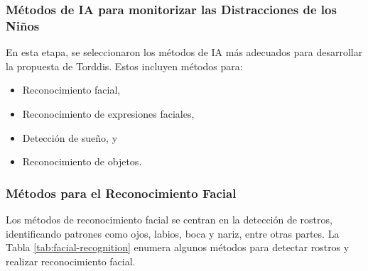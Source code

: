 \documentclass[a4paper,fleqn]{cas-sc}
\begin{document}
		\subsubsection*{Métodos de IA para monitorizar las Distracciones de los Niños}
		
		En esta etapa, se seleccionaron los métodos de IA más adecuados para desarrollar la propuesta de Torddis. Estos incluyen métodos para:
		
		\begin{itemize}
			\item Reconocimiento facial,
			\item Reconocimiento de expresiones faciales,
			\item Detección de sueño, y
			\item Reconocimiento de objetos.
		\end{itemize}
		
		\subsubsection*{Métodos para el Reconocimiento Facial}
		Los métodos de reconocimiento facial se centran en la detección de rostros, identificando patrones como ojos, labios, boca y nariz, entre otras partes. La Tabla \ref{tab:facial-recognition} enumera algunos métodos para detectar rostros y realizar reconocimiento facial.
		
\end{document}
